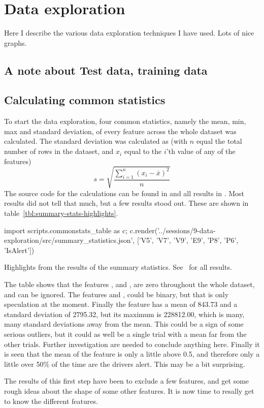 \chapter{Data exploration}
Here I describe the various data exploration techniques I have used. Lots of nice graphs. 


\section{A note about Test data, training data}

\section{Calculating common statistics}
To start the data exploration, four common statistics, namely the mean, min, max and standard deviation, of every feature across the whole dataset was calculated. The standard deviation was calculated as (with $n$ equal the total number of rows in the dataset, and $x_i$ equal to the $i$'th value of any of the features)
\[
    s = \sqrt{\frac{\sum_{i=1}^n (x_i-\bar{x})^2}{n}}
\]
The source code for the calculations can be found in  and all results in . Most results did not tell that much, but a few results stood out. These are shown in table~\ref{tbl:summary-stats-highlights}.
\begin{table}
    {\small\sffamily
        \begin{python}
            import scripts.commonstats_table as c; c.render('../sessions/9-data-exploration/src/summary_statistics.json', ['V5', 'V7', 'V9', 'E9', 'P8', 'P6', 'IsAlert'])
        \end{python}
    }
    \caption{Highlights from the results of the summary statistics. See~ for all results.}
    \label{tbl:summary-stats-highlights}
\end{table}
The table shows that the features ,  and , are zero throughout the whole dataset, and can be ignored. The features  and , could be binary, but that is only speculation at the moment. Finally the feature  has a mean of 843.73 and a standard deviation of 2795.32, but its maximum is 228812.00, which is many, many standard deviations away from the mean. This could be a sign of some serious outliers, but it could as well be a single trial with a mean far from the other trials. Further investigation are needed to conclude anything here. Finally it is seen that the mean of the  feature is only a little above 0.5, and therefore only a little over 50\% of the time are the drivers alert. This may be a bit surprising. \par
The results of this first step have been to exclude a few features, and get some rough ideas about the shape of some other features. It is now time to resally get to know the different features.

